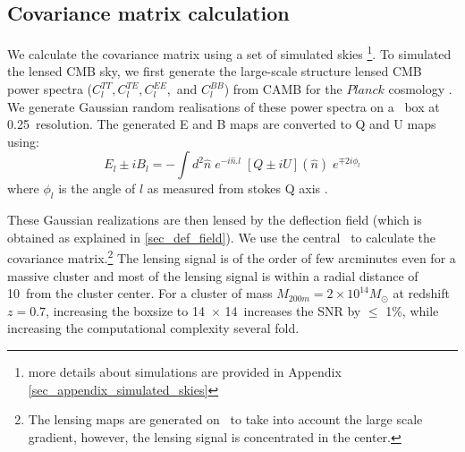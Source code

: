 

\subsection{Covariance matrix calculation}
\label{sec_covmat}

 We calculate the covariance matrix using a set of simulated skies \footnote{more details about simulations are provided in Appendix \ref{sec_appendix_simulated_skies}}. 
 To simulated the lensed CMB sky, we first generate the large-scale structure lensed CMB power spectra ($C^{TT}_{l}, C^{TE}_{l}, C^{EE}_{l},$ and $C^{BB}_{l}$) from CAMB for the $Planck$ cosmology \citep{planck15-13}.  
 We generate Gaussian random realisations of these power spectra on a \mediumboxsize\ box at 0.25\am\ resolution. 
The generated E and B maps are converted to Q and U maps using:
 \begin{equation}
 E_{l} \pm i B_{l} = - \int d^{2} \hat{n} \; e^{-i \hat{n}. l}\; [Q \pm iU] (\hat{n}) \; e^{\mp 2 i\phi_{l}}  
 \label{eq:coord_trans}
 \end{equation}
 where $\phi_{l}$ is the angle of $l$ as measured from stokes Q axis \citep{leistedt16}.
 

 These Gaussian realizations are then lensed by the deflection field (which is obtained as explained in \ref{sec_def_field}). 
 We use the central \smallboxsize\ to calculate the covariance matrix.\footnote{The lensing maps are generated on \mediumboxsize\ to take into account the large scale gradient, however, the lensing signal is concentrated in the center.}
 The lensing signal is of the order of few arcminutes even for a massive cluster and most of the lensing signal is within a radial distance of  10\am\ from the cluster center.
For a cluster of mass $M_{200m} = 2 \times 10^{14} M_{\odot}$ at redshift $z = 0.7$, increasing the boxsize to 14\am\ $\times$ 14\am\ increases the SNR by $\le$ 1\%, while increasing the computational complexity several fold.

